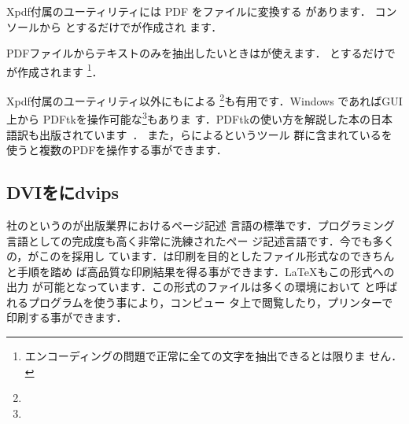 Xpdf付属のユーティリティには PDF を\PS ファイルに変換する
があります．%
コンソールから  とするだけでが作成され
ます．


PDFファイルからテキストのみを抽出したいときはが使えます．
 とするだけでが作成されます
\footnote{エンコーディングの問題で正常に全ての文字を抽出できるとは限りま
せん．}．


Xpdf付属のユーティリティ以外にもによる
\footnote{\webPdftk}も有用です．Windows であればGUI上から
PDFtkを操作可能な\footnote{\webPdftkWinGui}もありま
す．PDFtkの使い方を解説した本の日本語訳も出版されています~\cite{pdftk}．
また，らによるというツール
群に含まれているを使うと複数のPDFを操作する事ができます．


\subsection{DVIを\PS に\zdash dvips}
社の\Prog[PostScript]{\PS}というのが出版業界におけるページ記述
言語の標準です．プログラミング言語としての完成度も高く非常に洗練されたペー
ジ記述言語です．今でも多くの，がこの{{\PS}}を採用し
ています．{{\PS}}は印刷を目的としたファイル形式なのできちんと手順を踏め
ば高品質な印刷結果を得る事ができます．{\LaTeX}もこの{\PS}形式への出力
が可能となっています．この{\PS}形式のファイルは多くの環境において
\Prog[Ghostscript]{\GS}と呼ばれるプログラムを使う事により，コンピュー
タ上で閲覧したり，プリンターで印刷する事ができます．

